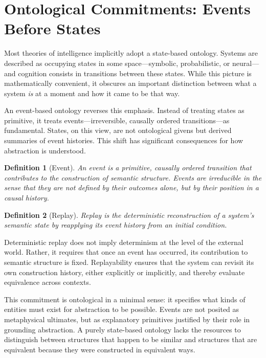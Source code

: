 \documentclass[11pt]{article}
\newtheorem{definition}{Definition}[section]
\begin{document}
\section{Ontological Commitments: Events Before States}

Most theories of intelligence implicitly adopt a state-based ontology. Systems are described as occupying states in some space—symbolic, probabilistic, or neural—and cognition consists in transitions between these states. While this picture is mathematically convenient, it obscures an important distinction between what a system \emph{is} at a moment and how it came to be that way.

An event-based ontology reverses this emphasis. Instead of treating states as primitive, it treats events—irreversible, causally ordered transitions—as fundamental. States, on this view, are not ontological givens but derived summaries of event histories. This shift has significant consequences for how abstraction is understood.

\begin{definition}[Event]
An event is a primitive, causally ordered transition that contributes to the construction of semantic structure. Events are irreducible in the sense that they are not defined by their outcomes alone, but by their position in a causal history.
\end{definition}

\begin{definition}[Replay]
Replay is the deterministic reconstruction of a system’s semantic state by reapplying its event history from an initial condition.
\end{definition}

Deterministic replay does not imply determinism at the level of the external world. Rather, it requires that once an event has occurred, its contribution to semantic structure is fixed. Replayability ensures that the system can revisit its own construction history, either explicitly or implicitly, and thereby evaluate equivalence across contexts.

This commitment is ontological in a minimal sense: it specifies what kinds of entities must exist for abstraction to be possible. Events are not posited as metaphysical ultimates, but as explanatory primitives justified by their role in grounding abstraction. A purely state-based ontology lacks the resources to distinguish between structures that happen to be similar and structures that are equivalent because they were constructed in equivalent ways.
\end{document}
